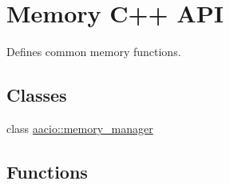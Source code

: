 \hypertarget{group__memorycppapi}{}\section{Memory C++ A\+PI}
\label{group__memorycppapi}


Defines common memory functions.  


\subsection*{Classes}
\begin{DoxyCompactItemize}
\item 
class \mbox{\hyperlink{classaacio_1_1memory__manager}{aacio\+::memory\+\_\+manager}}
\end{DoxyCompactItemize}
\subsection*{Functions}
